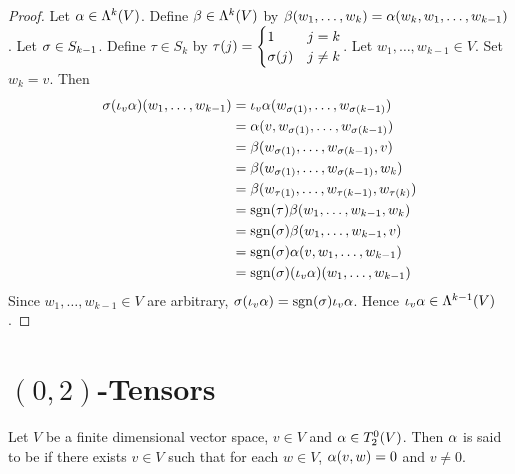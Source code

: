 \documentclass{book}
\begin{document}
	\begin{proof}
		Let $\alpha \in \Lambda^k(V)$. Define $\beta \in \Lambda^{k}(V)$ by $\beta(w_1, \ldots, w_k) = \alpha(w_k, w_1, \ldots, w_{k-1})$ . Let $\sigma \in S_{k-1}$. Define $\tau \in S_k$ by 
		$\tau(j) = 
		\begin{cases}
			1       & j = k \\
			\sigma(j) & j \neq k 
		\end{cases}$. 
		Let $w_1, \ldots, w_{k-1} \in V$. Set $w_k = v$. Then 
		\begin{align*}
			\sigma (\iota_v \alpha) (w_1, \ldots, w_{k-1})
			& = \iota_v \alpha (w_{\sigma(1)}, \ldots, w_{\sigma(k-1)}) \\
			& = \alpha (v, w_{\sigma(1)}, \ldots, w_{\sigma(k-1)}) \\
			& = \beta(w_{\sigma(1)}, \ldots, w_{\sigma(k-1)}, v) \\
			& = \beta(w_{\sigma(1)}, \ldots, w_{\sigma(k-1)}, w_k) \\
			& = \beta(w_{\tau(1)}, \ldots, w_{\tau(k-1)}, w_{\tau(k)}) \\
			& = \operatorname{sgn} (\tau) \beta (w_1, \ldots, w_{k-1}, w_k) \\
			& = \operatorname{sgn}(\sigma) \beta (w_1, \ldots, w_{k-1}, v) \\
			& = \operatorname{sgn}(\sigma) \alpha (v, w_1, \ldots, w_{k-1}) \\
			& = \operatorname{sgn}(\sigma) (\iota_v \alpha) (w_1, \ldots, w_{k-1})
		\end{align*}
		Since $w_1, \ldots, w_{k-1} \in V$ are arbitrary, $\sigma(\iota_v \alpha) = \operatorname{sgn}(\sigma) \iota_v \alpha$. Hence $\iota_v \alpha \in \Lambda^{k-1}(V)$.
	\end{proof}


























	
	\newpage
	\section{$(0,2)$-Tensors}
	\begin{defn}
		Let $V$ be a finite dimensional vector space, $v \in V$ and $\alpha \in T^0_2(V)$. Then $\alpha$ is said to be  if  there exists $v \in V$ such that for each $w \in V$, $\alpha(v, w) = 0$ and $v \neq 0$. 
	\end{defn}
\end{document}
